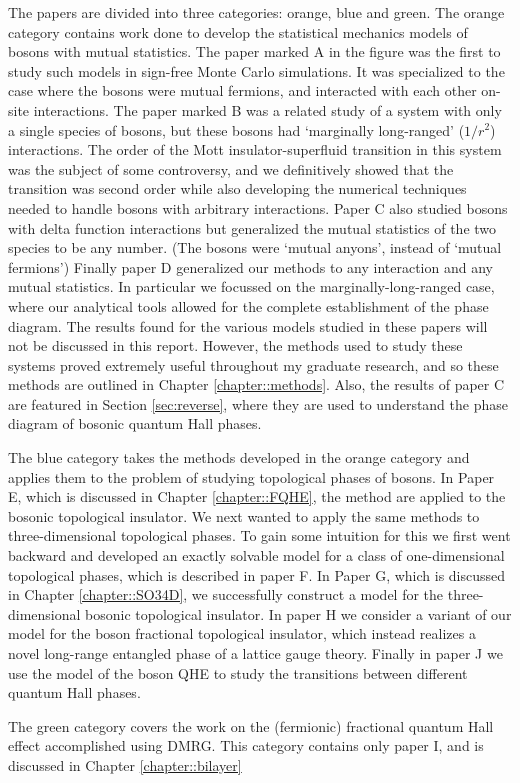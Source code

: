 The papers are divided into three categories: orange, blue and green. The orange category contains work done to develop the statistical mechanics models of bosons with mutual statistics. The paper marked A in the figure was the first to study such models in sign-free Monte Carlo simulations. It was specialized to the case where the bosons were mutual fermions, and interacted with each other on-site interactions. 
The paper marked B was a related study of a system with only a single species of bosons, but these bosons had `marginally long-ranged' ($1/r^2$) interactions. The order of the Mott insulator-superfluid transition in this system was the subject of some controversy, and we definitively showed that the transition was second order while also developing the numerical techniques needed to handle bosons with arbitrary interactions. 
Paper C also studied bosons with delta function interactions but generalized the mutual statistics of the two species to be any number. (The bosons were `mutual anyons', instead of `mutual fermions') 
Finally paper D generalized our methods to any interaction and any mutual statistics. In particular we focussed on the marginally-long-ranged case, where our analytical tools allowed for the complete establishment of the phase diagram. The results found for the various models studied in these papers will not be discussed in this report. However, the methods used to study these systems proved extremely useful throughout my graduate research, and so these methods are outlined in Chapter \ref{chapter::methods}. Also, the results of paper C are featured in Section \ref{sec:reverse}, where they are used to understand the phase diagram of bosonic quantum Hall phases.

The blue category takes the methods developed in the orange category and applies them to the problem of studying topological phases of bosons. In Paper E, which is discussed in Chapter \ref{chapter::FQHE}, the method are applied to the bosonic topological insulator. We next wanted to apply the same methods to three-dimensional topological phases. To gain some intuition for this we first went backward and developed an exactly solvable model for a class of one-dimensional topological phases, which is described in paper F. In Paper G, which is discussed in Chapter \ref{chapter::SO34D}, we successfully construct a model for the three-dimensional bosonic topological insulator. In paper H we consider a variant of our model for the boson fractional topological insulator, which instead realizes a novel long-range entangled phase of a lattice gauge theory. Finally in paper J we use the model of the boson QHE to study the transitions between different quantum Hall phases.

The green category covers the work on the (fermionic) fractional quantum Hall effect accomplished using DMRG. This category contains only paper I, and is discussed in Chapter \ref{chapter::bilayer}
